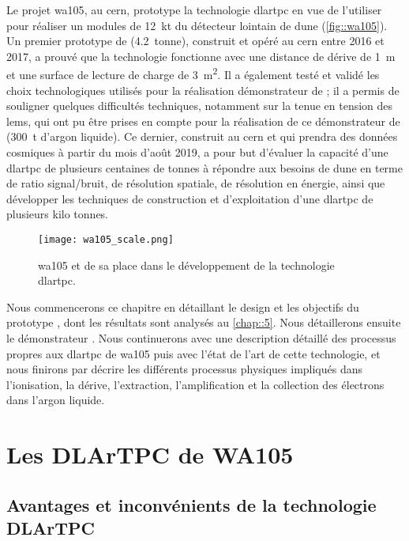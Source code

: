     Le projet \gls{wa105}, au \gls{cern}, prototype la technologie \gls{dlartpc} en vue de l'utiliser pour réaliser un modules de \SI{12}{\kilo\tonne} du détecteur lointain de \gls{dune} (\autoref{fig::wa105}). Un premier prototype de \TOO{} (\SI{4.2}{tonne}), construit et opéré au \gls{cern} entre 2016 et 2017, a prouvé que la technologie fonctionne avec une distance de dérive de \SI{1}{\meter} et une surface de lecture de charge de \SI{3}{\meter\squared}. Il a également testé et validé les choix technologiques utilisés pour la réalisation démonstrateur de \protodp{}; il a permis de souligner quelques difficultés techniques, notamment sur la tenue en tension des \glspl{lem}, qui ont pu être prises en compte pour la réalisation de ce démonstrateur de \SSS{} (\SI{300}{\tonne} d'argon liquide). Ce dernier, construit au \gls{cern} et qui prendra des données cosmiques à partir du mois d'août 2019, a pour but d'évaluer la capacité d'une \gls{dlartpc} de plusieurs centaines de tonnes à répondre aux besoins de \gls{dune} en terme de ratio signal/bruit, de résolution spatiale, de résolution en énergie, ainsi que développer les techniques de construction et d'exploitation d'une \gls{dlartpc} de plusieurs kilo tonnes.

    \begin{figure}[!htb]
      \centering
      \texttt{[image: wa105\_scale.png]}        
      \caption[Le projet WA105]{\label{fig::wa105}\gls{wa105} et de sa place dans le développement de la technologie \gls{dlartpc}.}
    \end{figure}

    Nous commencerons ce chapitre en détaillant le design et les objectifs du prototype \TOO{}, dont les résultats sont analysés au \autoref{chap::5}. Nous détaillerons ensuite le démonstrateur \SSS{}. Nous continuerons avec une description détaillé des processus propres aux \gls{dlartpc} de \gls{wa105} puis avec l'état de l'art de cette technologie, et nous finirons par décrire les différents processus physiques impliqués dans l'ionisation, la dérive, l'extraction, l'amplification et la collection des électrons dans l'argon liquide.

  \section{Les DLArTPC de WA105}

    \subsection{Avantages et inconvénients de la technologie DLArTPC}

